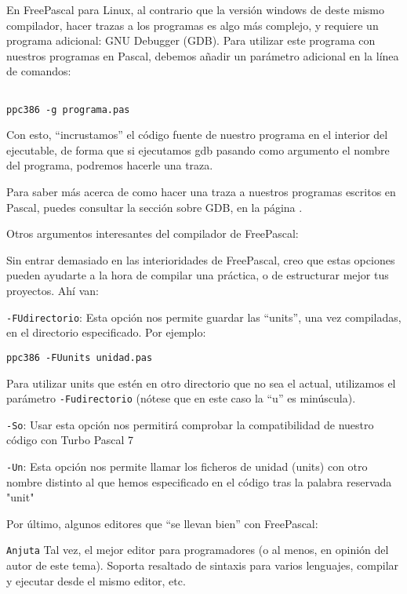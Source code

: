 En FreePascal para Linux, al contrario que la versión windows de deste
mismo compilador, hacer trazas a los programas es algo más complejo, y
requiere un programa adicional: GNU Debugger (GDB). Para utilizar este
programa con nuestros programas en Pascal, debemos añadir un parámetro
adicional en la línea de comandos:

\begin{verbatim}

ppc386 -g programa.pas

\end{verbatim}

Con esto, ``incrustamos'' el código fuente de nuestro programa en el
interior del ejecutable, de forma que si ejecutamos gdb pasando como
argumento el nombre del programa, podremos hacerle una traza.

Para saber  más acerca de  como hacer  una traza a  nuestros programas
escritos  en Pascal,  puedes consultar  la  sección sobre  GDB, en  la
página \pageref{gdb}.

Otros argumentos interesantes del compilador de FreePascal:

Sin entrar  demasiado en  las interioridades  de FreePascal,  creo que
estas opciones pueden  ayudarte a la hora de compilar  una práctica, o
de estructurar mejor tus proyectos. Ahí van:

{\tt -FUdirectorio}:  Esta opción  nos permite guardar  las ``units'',
una vez compiladas, en el directorio especificado. Por ejemplo:

\begin{verbatim}
ppc386 -FUunits unidad.pas
\end{verbatim}

Para utilizar units que estén en otro directorio que no sea el actual,
utilizamos el parámetro  {\tt -Fudirectorio} (nótese que  en este caso
la ``u'' es minúscula).


{\tt -So}: Usar esta opción nos permitirá comprobar la compatibilidad
de nuestro código con Turbo Pascal 7

{\tt -Un}: Esta opción nos permite llamar los ficheros de unidad (units)
con otro nombre distinto al que hemos especificado en el código tras
la palabra reservada "unit"


Por último, algunos editores que ``se llevan bien'' con FreePascal:

{\tt Anjuta} Tal vez, el mejor  editor para programadores (o al menos,
en opinión del autor de este tema). Soporta resaltado de sintaxis para
varios lenguajes, compilar y ejecutar desde el mismo editor, etc.

